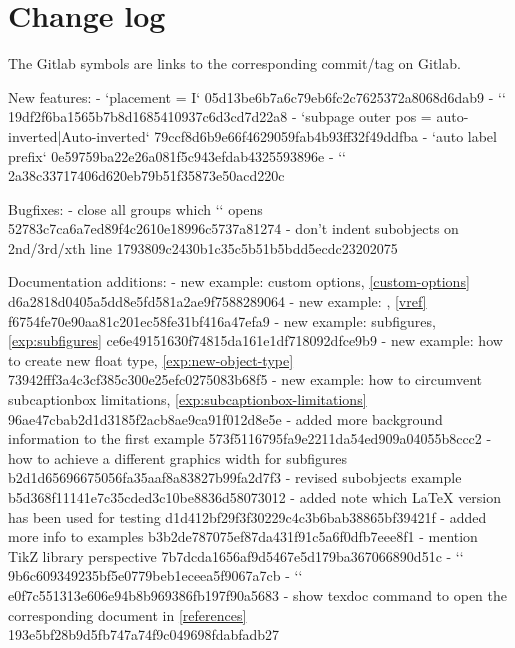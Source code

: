 

\section{Change log}
The Gitlab symbols are links to the corresponding commit/tag on Gitlab.

\begin{changelog}

New features:
- `placement = I`
  \commit 05d13be6b7a6c79eb6fc2c7625372a8068d6dab9
- `\splitobject`
  \commit 19df2f6ba1565b7b8d1685410937c6d3cd7d22a8
- `subpage outer pos = auto-inverted|Auto-inverted`
  \commit 79ccf8d6b9e66f4629059fab4b93ff32f49ddfba
- `auto label prefix`
  \commit 0e59759ba22e26a081f5c943efdab4325593896e
- `\AtEndObject`
  \commit 2a38c33717406d620eb79b51f35873e50acd220c

Bugfixes:
- close all groups which `` opens
  \commit 52783c7ca6a7ed89f4c2610e18996c5737a81274
- don't indent subobjects on 2nd/3rd/xth line
  \commit 1793809c2430b1c35c5b51b5bdd5ecdc23202075

Documentation additions:
- new example: custom options, \cref{custom-options}
  \commit d6a2818d0405a5dd8e5fd581a2ae9f7588289064
- new example: , \cref{vref}
  \commit f6754fe70e90aa81c201ec58fe31bf416a47efa9
- new example: subfigures, \cref{exp:subfigures}
  \commit ce6e49151630f74815da161e1df718092dfce9b9
- new example: how to create new float type, \cref{exp:new-object-type}
  \commit 73942fff3a4c3cf385c300e25efc0275083b68f5
- new example: how to circumvent subcaptionbox limitations, \cref{exp:subcaptionbox-limitations}
  \commit 96ae47cbab2d1d3185f2acb8ae9ca91f012d8e5e
- added more background information to the first example
  \commit 573f5116795fa9e2211da54ed909a04055b8ccc2
- how to achieve a different graphics width for subfigures
  \commit b2d1d65696675056fa35aaf8a83827b99fa2d7f3
- revised subobjects example
  \commit b5d368f11141e7c35cded3c10be8836d58073012
- added note which LaTeX version has been used for testing
  \commit d1d412bf29f3f30229c4c3b6bab38865bf39421f
- added more info to examples
  \commit b3b2de787075ef87da431f91c5a6f0dfb7eee8f1
- mention TikZ library perspective
  \commit 7b7dcda1656af9d5467e5d179ba367066890d51c
- `\crefname`
  \commit 9b6c609349235bf5e0779beb1eceea5f9067a7cb
- `\Crefname`
  \commit e0f7c551313e606e94b8b969386fb197f90a5683
- show texdoc command to open the corresponding document in \cref{references}
  \commit 193e5bf28b9d5fb747a74f9c049698fdabfadb27


\end{changelog}
